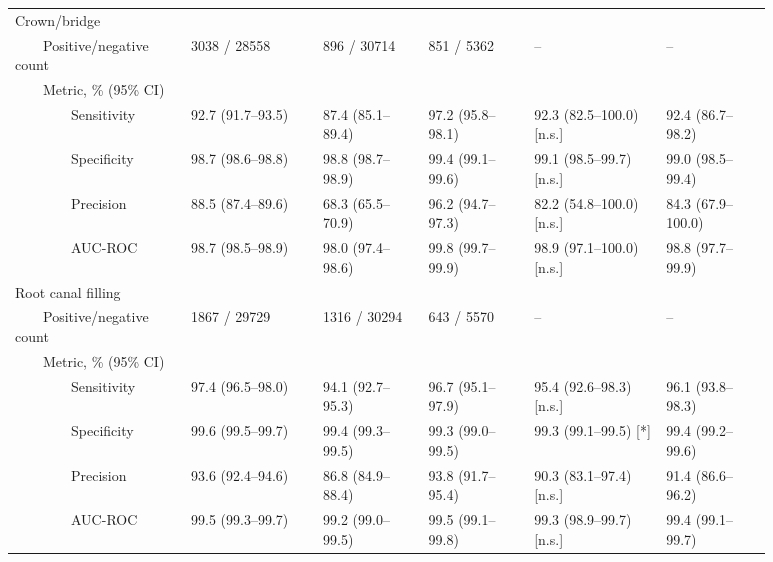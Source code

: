 \begin{table}[!h]
\begin{tabular}{ p{0.2\linewidth}p{0.15\linewidth}p{0.125\linewidth}p{0.125\linewidth}|p{0.15\linewidth}p{0.125\linewidth} }
Crown/bridge &   &   &   &   &   \\
{~~~~}Positive/negative count & \num{3038} / \num{28558} & \num{896} / \num{30714} & \num{851} / \num{5362} & -- & -- \\
{~~~~}Metric, \% (95\% CI) &   &   &   &   &   \\
{~~~~~~~~}Sensitivity & 92.7 {(91.7--93.5)} & 87.4 {(85.1--89.4)} & 97.2 {(95.8--98.1)} & 92.3 (82.5--100.0) [n.s.] & 92.4 (86.7--98.2) \\
{~~~~~~~~}Specificity & 98.7 {(98.6--98.8)} & 98.8 {(98.7--98.9)} & 99.4 {(99.1--99.6)} & 99.1 (98.5--99.7) [n.s.] & 99.0 (98.5--99.4) \\
{~~~~~~~~}Precision & 88.5 {(87.4--89.6)} & 68.3 {(65.5--70.9)} & 96.2 {(94.7--97.3)} & 82.2 (54.8--100.0) [n.s.] & 84.3 (67.9--100.0) \\
{~~~~~~~~}AUC-ROC & 98.7 {(98.5--98.9)} & 98.0 {(97.4--98.6)} & 99.8 {(99.7--99.9)} & 98.9 (97.1--100.0) [n.s.] & 98.8 (97.7--99.9) \\ \midrule

Root canal filling &   &   &   &   &   \\
{~~~~}Positive/negative count & \num{1867} / \num{29729} & \num{1316} / \num{30294} & \num{643} / \num{5570} & -- & -- \\
{~~~~}Metric, \% (95\% CI) &   &   &   &   &   \\
{~~~~~~~~}Sensitivity & 97.4 {(96.5--98.0)} & 94.1 {(92.7--95.3)} & 96.7 {(95.1--97.9)} & 95.4 (92.6--98.3) [n.s.] & 96.1 (93.8--98.3) \\
{~~~~~~~~}Specificity & 99.6 {(99.5--99.7)} & 99.4 {(99.3--99.5)} & 99.3 {(99.0--99.5)} & 99.3 (99.1--99.5) [*] & 99.4 (99.2--99.6) \\
{~~~~~~~~}Precision & 93.6 {(92.4--94.6)} & 86.8 {(84.9--88.4)} & 93.8 {(91.7--95.4)} & 90.3 (83.1--97.4) [n.s.] & 91.4 (86.6--96.2) \\
{~~~~~~~~}AUC-ROC & 99.5 {(99.3--99.7)} & 99.2 {(99.0--99.5)} & 99.5 {(99.1--99.8)} & 99.3 (98.9--99.7) [n.s.] & 99.4 (99.1--99.7) \\ \midrule


\end{tabular}
\end{table}
